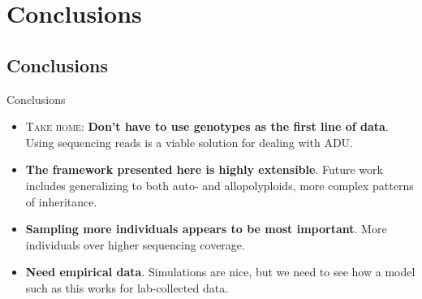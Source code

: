 \documentclass[presentation]{beamer}
\begin{document}
\section{Conclusions}

\subsection*{Conclusions}

\begin{frame}[t]{Conclusions}
	\fontsize{10pt}{10}\selectfont
	\begin{itemize}
		\item \textsc{Take home}: \textbf{Don't have to use genotypes as the first line of data}. Using sequencing reads is a viable solution for dealing with ADU.
		\vspace{0.2in}
	
		\item \textbf{The framework presented here is highly extensible}. Future work includes generalizing to both auto- and allopolyploids, more complex patterns of inheritance.
		\vspace{0.2in}
		
		\item \textbf{Sampling more individuals appears to be most important}. More individuals over higher sequencing coverage.
		\vspace{0.2in}
		
		\item \textbf{Need empirical data}. Simulations are nice, but we need to see how a model such as this works for lab-collected data.
		
	\end{itemize}
	
\end{frame}

\section*{}
\end{document}
